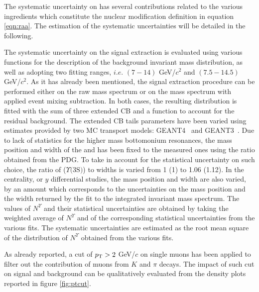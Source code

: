 The systematic uncertainty on \raa has several contributions related to the various ingredients which constitute the nuclear modification definition in equation \ref{eqn:raa}.
The estimation of the systematic uncertainties will be detailed in the following.

The systematic uncertainty on the signal extraction is evaluated using various functions for the description of the background invariant mass distribution, as well as adopting two fitting ranges, $i.e.$ $(7-14)$ GeV/$c^2$ and $(7.5-14.5)$ GeV/$c^2$.
As it has already been mentioned, the signal extraction procedure can be performed either on the raw mass spectrum or on the mass spectrum with applied event mixing subtraction.
In both cases, the resulting distribution is fitted with the sum of three extended CB and a function to account for the residual background.
The extended CB tails parameters have been varied using estimates provided by two MC transport models: GEANT4~\cite{Agostinelli:2002hh} and GEANT3~\cite{Brun:1082634}. 
Due to lack of statistics for the higher mass bottomonium resonances, the mass position and width of the \upsiss and \upsisss has been fixed to the \upsis measured ones using the ratio obtained from the PDG.
To take in account for the statistical uncertainty on such choice, the ratio of \upsiss ($\Upsilon\text{(3S)}$) to \upsis widths is varied from 1 (1) to 1.06 (1.12).
In the centrality, \pt or $y$ differential studies, the mass position and width are also varied, by an amount which corresponds to the uncertainties on the mass position and the width returned by the fit to the integrated invariant mass spectrum. 
The values of $N^{\Upsilon}$ and their statistical uncertainties are obtained by taking the weighted average of $N^{\Upsilon}$ and of the corresponding statistical uncertainties from the various fits.
The systematic uncertainties are estimated as the root mean square of the distribution of $N^{\Upsilon}$ obtained from the various fits.

As already reported, a cut of $p_{\rm T} > 2$ GeV/$c$ on single muons has been applied to filter out the contribution of muons from $K$ and $\pi$ decays.
The impact of such cut on signal and background can be qualitatively evaluated from the density plots reported in figure \ref{fig:ptcut}.

